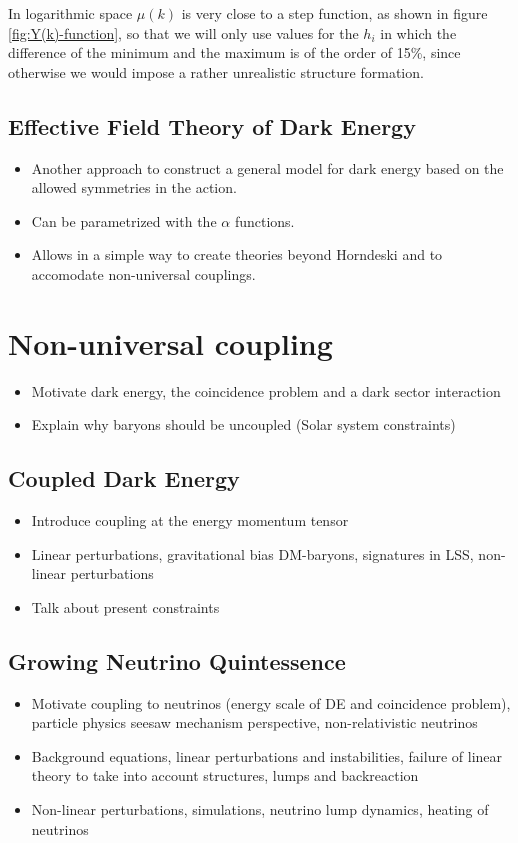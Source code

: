 In logarithmic space $\mu(k)$ is very close to a step function, as
shown in figure \ref{fig:Y(k)-function}, so that we will only use
values for the $h_{i}$ in which the difference of the minimum and
the maximum is of the order of 15\%, since otherwise we would impose
a rather unrealistic structure formation.


\subsection{Effective Field Theory of Dark Energy}

\begin{itemize}
\item Another approach to construct a general model for dark energy based
on the allowed symmetries in the action.
\item Can be parametrized with the $\alpha$ functions.
\item Allows in a simple way to create theories beyond Horndeski and to
accomodate non-universal couplings.
\end{itemize}

\section{Non-universal coupling}

\begin{itemize}
\item Motivate dark energy, the coincidence problem and a dark sector interaction
\item Explain why baryons should be uncoupled (Solar system constraints)
\end{itemize}

\subsection{Coupled Dark Energy}

\begin{itemize}
\item Introduce coupling at the energy momentum tensor
\item Linear perturbations, gravitational bias DM-baryons, signatures in
LSS, non-linear perturbations
\item Talk about present constraints
\end{itemize}

\subsection{Growing Neutrino Quintessence}
\begin{itemize}
\item Motivate coupling to neutrinos (energy scale of DE and coincidence
problem), particle physics seesaw mechanism perspective, non-relativistic
neutrinos
\item Background equations, linear perturbations and instabilities, failure
of linear theory to take into account structures, lumps and backreaction
\item Non-linear perturbations, simulations, neutrino lump dynamics, heating
of neutrinos
\end{itemize}

